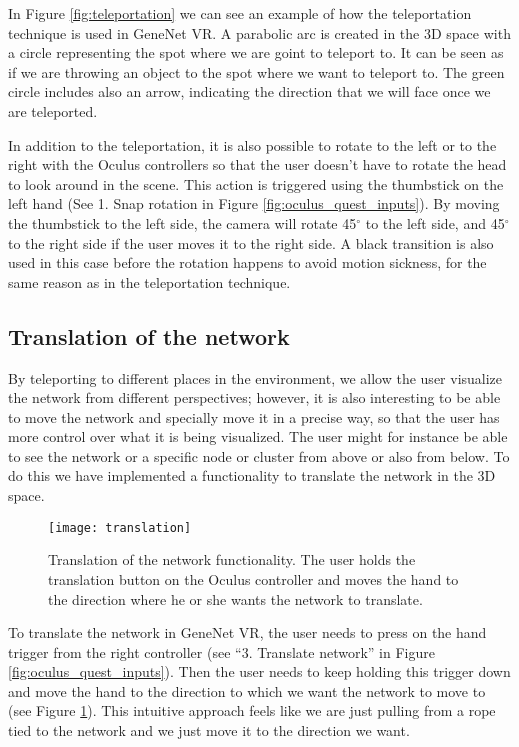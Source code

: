 In Figure \ref{fig:teleportation} we can see an example of how the teleportation technique is used in GeneNet VR. A  parabolic arc is created in the 3D space with a circle representing the spot where we are goint to teleport to. It can be seen as if we are throwing an object to the spot where we want to teleport to. The green circle includes also an arrow, indicating the direction that we will face once we are teleported.

In addition to the teleportation, it is also possible to rotate to the left or to the right with the Oculus controllers so that the user doesn't have to rotate the head to look around in the scene. This action is triggered using the thumbstick on the left hand (See 1. Snap rotation in Figure \ref{fig:oculus_quest_inputs}). By moving the thumbstick to the left side, the camera will rotate 45$^{\circ}$ to the left side, and 45$^{\circ}$ to the right side if the user moves it to the right side. A black transition is also used in this case before the rotation happens to avoid motion sickness, for the same reason as in the teleportation technique.

\subsection{Translation of the network}
By teleporting to different places in the environment, we allow the user visualize the network from different perspectives; however, it is also interesting to be able to move the network and specially move it in a precise way, so that the user has more control over what it is being visualized. The user might for instance be able to see the network or a specific node or cluster from above or also from below. To do this we have implemented a functionality to translate the network in the 3D space.

\begin{figure}[h!]
    \centering%
    \texttt{[image: translation]}
    \caption{Translation of the network functionality. The user holds the translation button on the Oculus controller and moves the hand to the direction where he or she wants the network to translate.}
    \label{fig:translation}
\end{figure}%

To translate the network in GeneNet VR, the user needs to press on the hand trigger from the right controller (see “3. Translate network” in Figure \ref{fig:oculus_quest_inputs}). Then the user needs to keep holding this trigger down and move the hand to the direction to which we want the network to move to (see Figure \ref{fig:translation}). This intuitive approach feels like we are just pulling from a rope tied to the network and we just move it to the direction we want.


